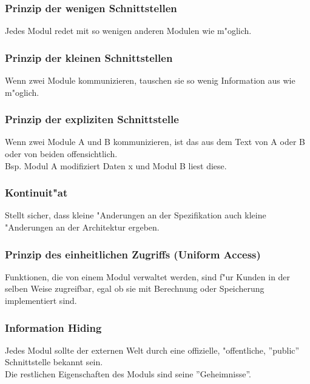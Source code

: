\documentclass[german, 10pt, a4paper, twocolumn]{scrartcl}
\theoremstyle{definition}
\begin{document}
\subsubsection{Prinzip der wenigen Schnittstellen}

Jedes Modul redet mit so wenigen anderen Modulen wie m"oglich.

\subsubsection{Prinzip der kleinen Schnittstellen}

Wenn zwei Module kommunizieren, tauschen sie so wenig Information aus wie m"oglich.

\subsubsection{Prinzip der expliziten Schnittstelle}

Wenn zwei Module A und B kommunizieren, ist das aus dem Text von A oder B oder von beiden offensichtlich.\\

Bsp. Modul A modifiziert Daten x und Modul B liest diese.

\subsubsection{Kontinuit"at}

Stellt sicher, dass kleine "Anderungen an der Spezifikation auch kleine "Anderungen an der Architektur ergeben.

\subsubsection{Prinzip des einheitlichen Zugriffs (Uniform Access)}

Funktionen, die von einem Modul verwaltet werden, sind f"ur Kunden in der selben Weise zugreifbar, egal ob sie mit Berechnung oder Speicherung implementiert sind.

\subsubsection{Information Hiding}

Jedes Modul sollte der externen Welt durch eine offizielle, "offentliche, ''public'' Schnittstelle bekannt sein.\\
Die restlichen Eigenschaften des Moduls sind seine ''Geheimnisse''.
\end{document}
